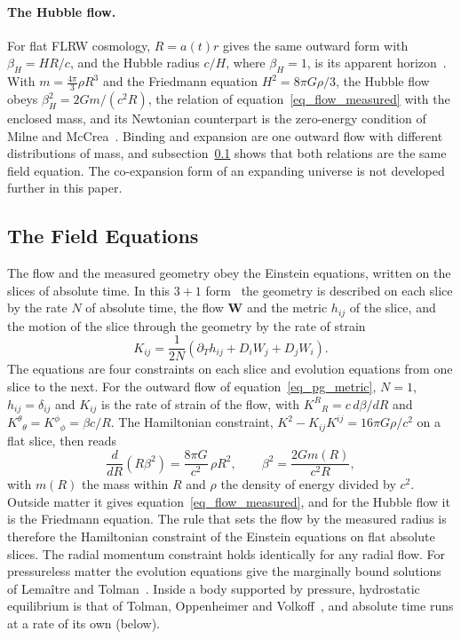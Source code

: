 \documentclass{iopjournal}
\begin{document}
\paragraph{The Hubble flow.} For flat FLRW cosmology, $R=a(t)r$ gives the same outward form with $\beta_H=HR/c$, and the Hubble radius $c/H$, where $\beta_H=1$, is its apparent horizon~\cite{Faraoni2011,Faraoni2022}. With $m=\tfrac{4\pi}{3}\rho R^3$ and the Friedmann equation $H^2=8\pi G\rho/3$, the Hubble flow obeys $\beta_H^2=2Gm/(c^2R)$, the relation of equation~\eqref{eq_flow_measured} with the enclosed mass, and its Newtonian counterpart is the zero-energy condition of Milne and McCrea~\cite{Milne1934,McCreaMilne1934}. Binding and expansion are one outward flow with different distributions of mass, and subsection~\ref{sec_field_equation} shows that both relations are the same field equation. The co-expansion form of an expanding universe is not developed further in this paper.

\subsection{The Field Equations}\label{sec_field_equation}

The flow and the measured geometry obey the Einstein equations, written on the slices of absolute time. In this $3+1$ form~\cite{ADM1962} the geometry is described on each slice by the rate $N$ of absolute time, the flow $\mathbf{W}$ and the metric $h_{ij}$ of the slice, and the motion of the slice through the geometry by the rate of strain
\begin{equation}\label{eq_rate_of_strain}
    K_{ij}=\frac{1}{2N}\left(\partial_Th_{ij}+D_iW_j+D_jW_i\right).
\end{equation}
The equations are four constraints on each slice and evolution equations from one slice to the next. For the outward flow of equation~\eqref{eq_pg_metric}, $N=1$, $h_{ij}=\delta_{ij}$ and $K_{ij}$ is the rate of strain of the flow, with $K^R{}_R=c\,d\beta/dR$ and $K^\theta{}_\theta=K^\phi{}_\phi=\beta c/R$. The Hamiltonian constraint, $K^2-K_{ij}K^{ij}=16\pi G\rho/c^2$ on a flat slice, then reads
\begin{equation}\label{eq_field_equation}
    \frac{d}{dR}\left(R\beta^2\right)=\frac{8\pi G}{c^2}\,\rho R^2,
    \qquad
    \beta^2=\frac{2Gm(R)}{c^2R},
\end{equation}
with $m(R)$ the mass within $R$ and $\rho$ the density of energy divided by $c^2$. Outside matter it gives equation~\eqref{eq_flow_measured}, and for the Hubble flow it is the Friedmann equation. The rule that sets the flow by the measured radius is therefore the Hamiltonian constraint of the Einstein equations on flat absolute slices. The radial momentum constraint holds identically for any radial flow. For pressureless matter the evolution equations give the marginally bound solutions of Lema\^itre and Tolman~\cite{Lemaitre1933,Tolman1934}. Inside a body supported by pressure, hydrostatic equilibrium is that of Tolman, Oppenheimer and Volkoff~\cite{Tolman1939,OppenheimerVolkoff1939}, and absolute time runs at a rate of its own (below).
\end{document}

